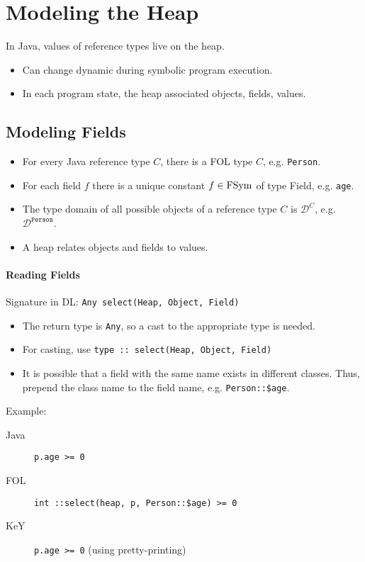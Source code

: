 	\section{Modeling the Heap}
		In Java, values of reference types live on the heap.
		\begin{itemize}
			\item Can change dynamic during symbolic program execution.
			\item In each program state, the heap associated objects, fields, values.
		\end{itemize}
		
		\subsection{Modeling Fields}
			\begin{itemize}
				\item For every Java reference type \(C\), there is a FOL type \(C\), e.g. \texttt{Person}.
				\item For each field \(f\) there is a unique constant \( f \in \operatorname{FSym} \) of type Field, e.g. \texttt{age}.
				\item The type domain of all possible objects of a reference type \(C\) is \( \mathcal{D}^C \), e.g. \( \mathcal{D}^\texttt{Person} \).
				\item A heap relates objects and fields to values.
			\end{itemize}
			
			\paragraph{Reading Fields}
				Signature in DL: \texttt{Any select(Heap, Object, Field)}
				\begin{itemize}
					\item The return type is \texttt{Any}, so a cast to the appropriate type is needed.
					\item For casting, use \texttt{type :: select(Heap, Object, Field)}
					\item It is possible that a field with the same name exists in different classes. Thus, prepend the class name to the field name, e.g. \texttt{Person::\$age}.
				\end{itemize}
				
				Example:
				\begin{description}
					\item[Java] \texttt{p.age >= 0}
					\item[FOL]  \texttt{int ::select(heap, p, Person::\$age) >= 0}
					\item[KeY]  \texttt{p.age >= 0} (using pretty-printing)
				\end{description}
			
